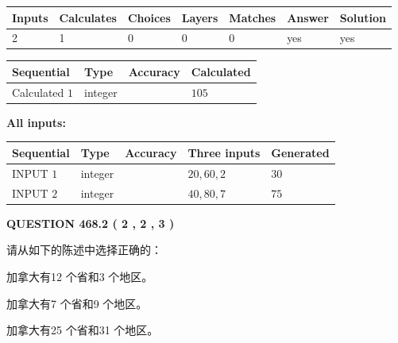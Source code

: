 \documentclass{ctexart}
\begin{document}
   
\noindent\begin{tabular}{|l|l|l|l|l|l|l|}
 \hline
Inputs & Calculates & Choices & Layers & Matches & Answer & Solution \\ \hline
 2  & 
 1  & 
 0
  & 
 0  & 
 0  & 
  yes & 
  yes 
  \\ \hline
 \end{tabular}
   
   
   
   
\noindent{}
   
   
  
  
\noindent\begin{tabular}{|l|l|l|l|}
\hline
 Sequential & Type & Accuracy & Calculated \\ 
\hline
 
 
  Calculated $  1 $ & integer &  & 
  $ 105 $ 
 \\  \hline  
 \end{tabular}
   
   
   
   
\noindent\vspace{0.1in}\hspace{-0.08in} {\textbf{\Large{All inputs: }}}
   
   
  
  
\noindent\begin{tabular}{|l|l|l|l|l|}
\hline
 Sequential & Type & Accuracy & Three inputs & Generated \\ 
\hline
 
 
  INPUT $  1 $ & integer &  & $
 20
 , 
 60
 , 
 2
 $ & $ 30 $ 
 \\  \hline  
 
 
  INPUT $  2 $ & integer &  & $
 40
 , 
 80
 , 
 7
 $ & $ 75 $ 
 \\  \hline  
 \end{tabular}
   
   
  
\vspace{0.2in}
  
{\textbf{\Large{QUESTION
468.2 
 ( 2 , 2 , 3 )
}}}
  
  
请从如下的陈述中选择正确的：
 
 
加拿大有12 个省和3 个地区。
 
 
加拿大有7 个省和9 个地区。
 
 
加拿大有25 个省和31 个地区。
 
\end{document}
